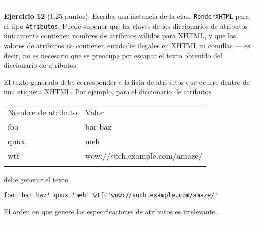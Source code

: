 \begin{center}\rule{3in}{0.4pt}\end{center}

\textbf{Ejercicio 12} (1.25 puntos): Escriba una instancia de la clase
\texttt{RenderXHTML} para el tipo \texttt{Atributos}. Puede suponer que
las claves de los diccionarios de atributos únicamente contienen nombres
de atributos válidos para XHTML, y que los valores de atributos no
contienen entidades ilegales en XHTML ni comillas --- es decir, no es
necesario que se preocupe por escapar el texto obtenido del diccionario
de atributos.

El texto generado debe corresponder a la lista de atributos que ocurre
dentro de una etiqueta XHTML. Por ejemplo, para el diccionario de
atributos

\begin{longtable}[c]{@{}ll@{}}
\toprule\addlinespace
Nombre de atributo & Valor
\\\addlinespace
\midrule\endhead
foo & bar baz
\\\addlinespace
quux & meh
\\\addlinespace
wtf & wow://such.example.com/amaze/
\\\addlinespace
\bottomrule
\end{longtable}

debe generar el texto

\begin{verbatim}
foo='bar baz' quux='meh' wtf='wow://such.example.com/amaze/'
\end{verbatim}

El orden en que genere las especificaciones de atributos es irrelevante.

\begin{Shaded}
\begin{Highlighting}[]
   
  \FunctionTok{=}  
            \FunctionTok{=} \FunctionTok{++}  \FunctionTok{++} \FunctionTok{++}  \FunctionTok{++} \FunctionTok{++} 
\end{Highlighting}
\end{Shaded}

\begin{center}\rule{3in}{0.4pt}\end{center}

